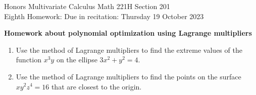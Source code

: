 \documentclass[12pt]{article}
\begin{document}
\LARGE 
\noindent
{\color{Maroon}Honors Multivariate Calculus \hfill Math 221H Section 201}\vspace{2pt}\\
\large
Eighth Homework:\hfill 
Due in recitation: Thursday 19 October 2023\vspace{2pt}

\normalsize
    {\bf {\color{Maroon}Homework about polynomial optimization using Lagrange multipliers}}\vspace{2pt}

\begin{enumerate}



\item Use  the method of Lagrange multipliers to find the extreme values of the function $x^3y$ on the ellipse $3x^2+y^2=4$.
\vspace{-2pt}
   
\item Use the method of Lagrange multipliers to find the points on the surface $x y^2 z^4=16$ that are closest to the
  origin. 
\vspace{-2pt}


\end{enumerate}
\end{document}
